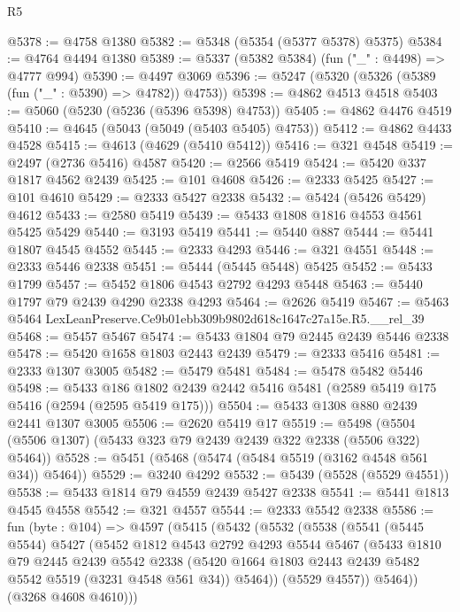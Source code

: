 \begin{lexlean}{R5}
\begin{coremodule}
@5378 := @4758 @1380
@5382 := @5348 (@5354 (@5377 @5378) @5375)
@5384 := @4764 @4494 @1380
@5389 := @5337 (@5382 @5384) (fun ("_" : @4498) => @4777 @994)
@5390 := @4497 @3069
@5396 := @5247 (@5320 (@5326 (@5389 (fun ("_" : @5390) => @4782)) @4753))
@5398 := @4862 @4513 @4518
@5403 := @5060 (@5230 (@5236 (@5396 @5398) @4753))
@5405 := @4862 @4476 @4519
@5410 := @4645 (@5043 (@5049 (@5403 @5405) @4753))
@5412 := @4862 @4433 @4528
@5415 := @4613 (@4629 (@5410 @5412))
@5416 := @321 @4548
@5419 := @2497 (@2736 @5416) @4587
@5420 := @2566 @5419
@5424 := @5420 @337 @1817 @4562 @2439
@5425 := @101 @4608
@5426 := @2333 @5425
@5427 := @101 @4610
@5429 := @2333 @5427 @2338
@5432 := @5424 (@5426 @5429) @4612
@5433 := @2580 @5419
@5439 := @5433 @1808 @1816 @4553 @4561 @5425 @5429
@5440 := @3193 @5419
@5441 := @5440 @887
@5444 := @5441 @1807 @4545 @4552
@5445 := @2333 @4293
@5446 := @321 @4551
@5448 := @2333 @5446 @2338
@5451 := @5444 (@5445 @5448) @5425
@5452 := @5433 @1799
@5457 := @5452 @1806 @4543 @2792 @4293 @5448
@5463 := @5440 @1797 @79 @2439 @4290 @2338 @4293
@5464 := @2626 @5419
@5467 := @5463 @5464 LexLeanPreserve.Ce9b01ebb309b9802d618c1647c27a15e.R5.__rel_39
@5468 := @5457 @5467
@5474 := @5433 @1804 @79 @2445 @2439 @5446 @2338
@5478 := @5420 @1658 @1803 @2443 @2439
@5479 := @2333 @5416
@5481 := @2333 @1307 @3005
@5482 := @5479 @5481
@5484 := @5478 @5482 @5446
@5498 := @5433
    @186
    @1802
    @2439
    @2442
    @5416
    @5481
    (@2589 @5419 @175 @5416 (@2594 (@2595 @5419 @175)))
@5504 := @5433 @1308 @880 @2439 @2441 @1307 @3005
@5506 := @2620 @5419 @17
@5519 := @5498 (@5504 (@5506 @1307) (@5433 @323 @79 @2439 @2439 @322 @2338 (@5506 @322) @5464))
@5528 := @5451 (@5468 (@5474 (@5484 @5519 (@3162 @4548 @561 @34)) @5464))
@5529 := @3240 @4292
@5532 := @5439 (@5528 (@5529 @4551))
@5538 := @5433 @1814 @79 @4559 @2439 @5427 @2338
@5541 := @5441 @1813 @4545 @4558
@5542 := @321 @4557
@5544 := @2333 @5542 @2338
@5586 := fun (byte : @104) =>
  @4597
    (@5415
      (@5432
        (@5532
          (@5538
            (@5541
              (@5445 @5544)
              @5427
              (@5452
                @1812
                @4543
                @2792
                @4293
                @5544
                @5467
                (@5433
                  @1810
                  @79
                  @2445
                  @2439
                  @5542
                  @2338
                  (@5420 @1664 @1803 @2443 @2439 @5482 @5542 @5519 (@3231 @4548 @561 @34))
                  @5464))
              (@5529 @4557))
            @5464))
        (@3268 @4608 @4610)))

\end{coremodule}
\end{lexlean}

